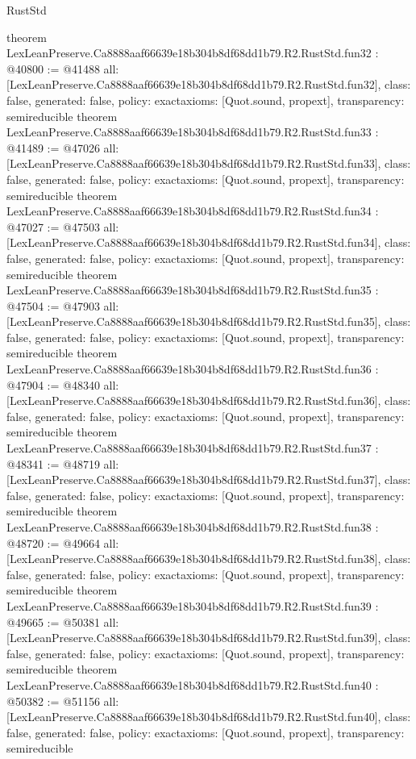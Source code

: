 \begin{lexlean}{RustStd}
\begin{coremodule}
{}
theorem LexLeanPreserve.Ca8888aaf66639e18b304b8df68dd1b79.R2.RustStd.fun32 : @40800 := @41488 {
  all: [LexLeanPreserve.Ca8888aaf66639e18b304b8df68dd1b79.R2.RustStd.fun32],
  class: false,
  generated: false,
  policy: exact{axioms: [Quot.sound, propext]},
  transparency: semireducible
}
theorem LexLeanPreserve.Ca8888aaf66639e18b304b8df68dd1b79.R2.RustStd.fun33 : @41489 := @47026 {
  all: [LexLeanPreserve.Ca8888aaf66639e18b304b8df68dd1b79.R2.RustStd.fun33],
  class: false,
  generated: false,
  policy: exact{axioms: [Quot.sound, propext]},
  transparency: semireducible
}
theorem LexLeanPreserve.Ca8888aaf66639e18b304b8df68dd1b79.R2.RustStd.fun34 : @47027 := @47503 {
  all: [LexLeanPreserve.Ca8888aaf66639e18b304b8df68dd1b79.R2.RustStd.fun34],
  class: false,
  generated: false,
  policy: exact{axioms: [Quot.sound, propext]},
  transparency: semireducible
}
theorem LexLeanPreserve.Ca8888aaf66639e18b304b8df68dd1b79.R2.RustStd.fun35 : @47504 := @47903 {
  all: [LexLeanPreserve.Ca8888aaf66639e18b304b8df68dd1b79.R2.RustStd.fun35],
  class: false,
  generated: false,
  policy: exact{axioms: [Quot.sound, propext]},
  transparency: semireducible
}
theorem LexLeanPreserve.Ca8888aaf66639e18b304b8df68dd1b79.R2.RustStd.fun36 : @47904 := @48340 {
  all: [LexLeanPreserve.Ca8888aaf66639e18b304b8df68dd1b79.R2.RustStd.fun36],
  class: false,
  generated: false,
  policy: exact{axioms: [Quot.sound, propext]},
  transparency: semireducible
}
theorem LexLeanPreserve.Ca8888aaf66639e18b304b8df68dd1b79.R2.RustStd.fun37 : @48341 := @48719 {
  all: [LexLeanPreserve.Ca8888aaf66639e18b304b8df68dd1b79.R2.RustStd.fun37],
  class: false,
  generated: false,
  policy: exact{axioms: [Quot.sound, propext]},
  transparency: semireducible
}
theorem LexLeanPreserve.Ca8888aaf66639e18b304b8df68dd1b79.R2.RustStd.fun38 : @48720 := @49664 {
  all: [LexLeanPreserve.Ca8888aaf66639e18b304b8df68dd1b79.R2.RustStd.fun38],
  class: false,
  generated: false,
  policy: exact{axioms: [Quot.sound, propext]},
  transparency: semireducible
}
theorem LexLeanPreserve.Ca8888aaf66639e18b304b8df68dd1b79.R2.RustStd.fun39 : @49665 := @50381 {
  all: [LexLeanPreserve.Ca8888aaf66639e18b304b8df68dd1b79.R2.RustStd.fun39],
  class: false,
  generated: false,
  policy: exact{axioms: [Quot.sound, propext]},
  transparency: semireducible
}
theorem LexLeanPreserve.Ca8888aaf66639e18b304b8df68dd1b79.R2.RustStd.fun40 : @50382 := @51156 {
  all: [LexLeanPreserve.Ca8888aaf66639e18b304b8df68dd1b79.R2.RustStd.fun40],
  class: false,
  generated: false,
  policy: exact{axioms: [Quot.sound, propext]},
  transparency: semireducible
}
\end{coremodule}
\end{lexlean}
